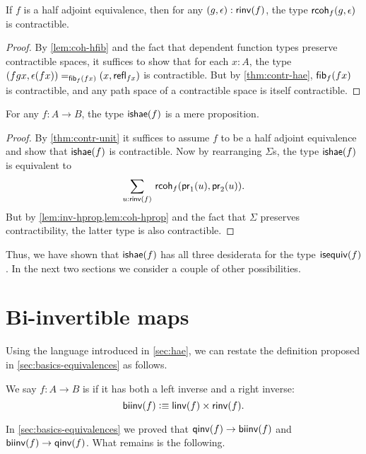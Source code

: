 \begin{lem}\label{lem:coh-hprop}
  If $f$ is a half adjoint equivalence, then for any $(g,\epsilon) : \rinv(f)$, the type $\rcoh{f}{g}{\epsilon}$ is contractible.
\end{lem}
\begin{proof}
  By \autoref{lem:coh-hfib} and the fact that dependent function types preserve contractible spaces, it suffices to show that for each $x:A$, the type $\id[\hfib{f}{fx}]{(fgx,\epsilon(fx))}{(x,\refl{fx})}$ is contractible.
  But by \autoref{thm:contr-hae}, $\hfib{f}{fx}$ is contractible, and any path space of a contractible space is itself contractible.
\end{proof}

\begin{thm}\label{thm:hae-hprop}
  For any $f : A \to B$, the type $\ishae(f)$ is a mere proposition.
\end{thm}
\begin{proof}
  By \autoref{thm:contr-unit} it suffices to assume $f$ to be a half adjoint equivalence and show that $\ishae(f)$ is contractible.
  Now by rearranging $\Sigma$s, the type $\ishae(f)$ is equivalent to
  \[\sm{u : \rinv(f)} \rcoh{f}{\proj{1}(u)}{\proj{2}(u)}.\]
  But by \cref{lem:inv-hprop,lem:coh-hprop} and the fact that $\Sigma$ preserves contractibility, the latter type is also contractible.
\end{proof}

Thus, we have shown that $\ishae(f)$ has all three desiderata for the type $\isequiv(f)$.
In the next two sections we consider a couple of other possibilities.


\section{Bi-invertible maps}
\label{sec:biinv}

Using the language introduced in \autoref{sec:hae}, we can restate the definition proposed in \autoref{sec:basics-equivalences} as follows.

\begin{defn}\label{defn:biinv}
  We say $f:A\to B$ is 
  if it has both a left inverse and a right inverse:
  \[ \biinv (f) \defeq \linv(f) \times \rinv(f). \]
\end{defn}

In \autoref{sec:basics-equivalences} we proved that $\qinv(f)\to\biinv(f)$ and $\biinv(f)\to\qinv(f)$.
What remains is the following.

